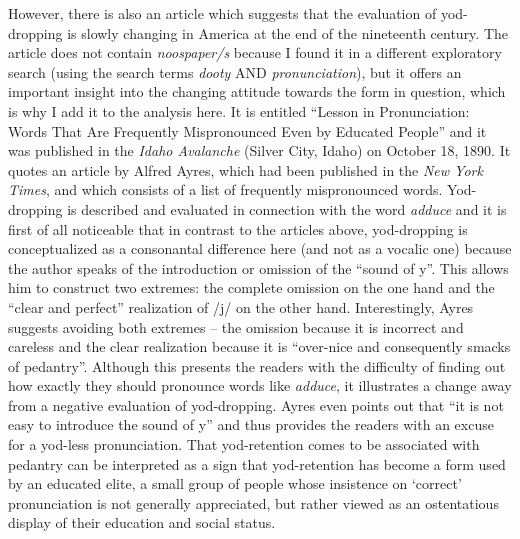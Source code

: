 However, there is also an article which suggests that the evaluation of yod-dropping is slowly changing in America at the end of the nineteenth century. The article does not contain \emph{noospaper/s} because I found it in a different exploratory search (using the search terms \emph{dooty} AND \emph{pronunciation}), but it offers an important insight into the changing attitude towards the form in question, which is why I add it to the analysis here. It is entitled “Lesson in Pronunciation: Words That Are Frequently Mispronounced Even by Educated People” and it was published in the \emph{Idaho Avalanche} (Silver City, Idaho) on October 18, 1890. It quotes an article by Alfred Ayres, which had been published in the \emph{New York Times}, and which consists of a list of frequently mispronounced words. Yod-dropping is described and evaluated in connection with the word \emph{adduce} and it is first of all noticeable that in contrast to the articles above, yod-dropping is conceptualized as a consonantal difference here (and not as a vocalic one) because the author speaks of the introduction or omission of the “sound of y”. This allows him to construct two extremes: the complete omission on the one hand and the “clear and perfect” realization of /j/ on the other hand. Interestingly, Ayres suggests avoiding both extremes – the omission because it is incorrect and careless and the clear realization because it is “over-nice and consequently smacks of pedantry”. Although this presents the readers with the difficulty of finding out how exactly they should pronounce words like \emph{adduce}, it illustrates a change away from a negative evaluation of yod-dropping. Ayres even points out that “it is not easy to introduce the sound of y” and thus provides the readers with an excuse for a yod-less pronunciation. That yod-retention comes to be associated with pedantry can be interpreted as a sign that yod-retention has become a form used by an educated elite, a small group of people whose insistence on ‘correct’ pronunciation is not generally appreciated, but rather viewed as an ostentatious display of their education and social status.

